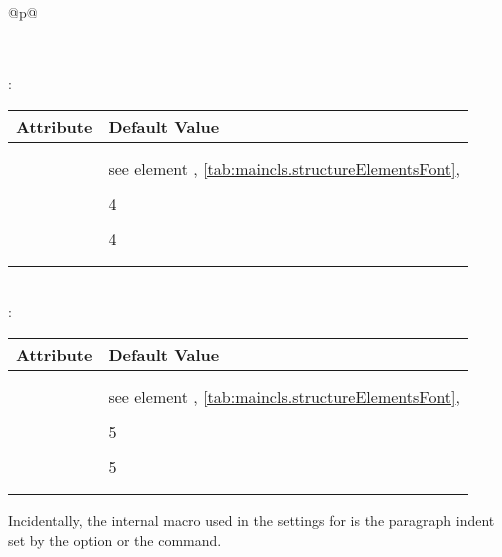 \begin{longtable}{@{}p{\columnwidth}@{}}
\begin{tabularx}{\linewidth}{ll}
    \PValue{tocstyle}    & \PValue{section} \\
    \bottomrule
    \end{tabularx} \\
    \addlinespace[\normalbaselineskip]
    : \\*
    \begin{tabularx}{\linewidth}{ll}
    \toprule
    Attribute & Default Value \\
    \midrule\nopagebreak
    \PValue{afterskip}   & \PValue{-1em} \\
    \PValue{beforeskip}  & \PValue{3.25ex plus 1ex minus .2ex} \\
    \PValue{font}        & see element \DescRef{maincls.fontelement.paragraph},
                           \autoref{tab:maincls.structureElementsFont}, 
                           \autopageref{tab:maincls.structureElementsFont} \\
    \PValue{indent}      & \PValue{0pt} \\
    \PValue{level}       & 4 \\
    \PValue{tocindent}   & \PValue{10em}\\
    \PValue{toclevel}    & 4 \\
    \PValue{tocnumwidth} & \PValue{5em}\\
    \PValue{tocstyle}    & \PValue{section} \\
    \bottomrule
    \end{tabularx} \\
    \addlinespace[\normalbaselineskip]
    :  \\*
    \begin{tabularx}{\linewidth}{ll}
    \toprule
    Attribute & Default Value \\
    \midrule\nopagebreak
    \PValue{afterskip}   & \PValue{-1em} \\
    \PValue{beforeskip}  & \PValue{3.25ex plus 1ex minus .2ex} \\
    \PValue{font}        & see element
                           \DescRef{maincls.fontelement.subparagraph},
                           \autoref{tab:maincls.structureElementsFont}, 
                           \autopageref{tab:maincls.structureElementsFont} \\
    \PValue{indent}      & \Macro{scr@parindent} \\
    \PValue{level}       & 5 \\
    \PValue{tocindent}   & \PValue{12em}\\
    \PValue{toclevel}    & 5 \\
    \PValue{tocnumwidth} & \PValue{6em}\\
    \PValue{tocstyle}    & \PValue{section} \\
    \bottomrule
    \end{tabularx}
  \end{longtable}
Incidentally, the internal macro  used in the settings
for  is the paragraph indent set by the
 option or the
 command.
\EndIndexGroup


